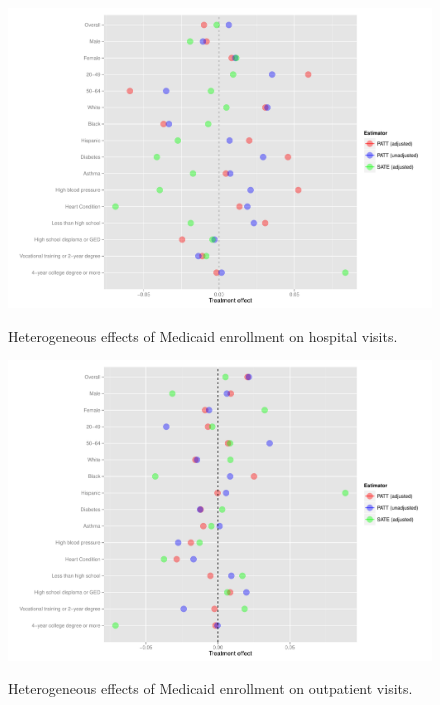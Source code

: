 \documentclass{beamer}
\begin{document}
\section[Heterogeneous treatment effects]{}
\begin{frame}
\begin{figure}[htbp]
\begin{center}
      \caption{Heterogeneous effects of Medicaid enrollment on hospital visits.}
   \includegraphics[scale=0.35]{../paper/any-visit-plot.pdf} 
   \label{het-plot-av}
   \end{center}
\end{figure}
\end{frame}

\begin{frame}
\begin{figure}[htbp]
\begin{center}
      \caption{Heterogeneous effects of Medicaid enrollment on outpatient visits.}
   \includegraphics[scale=0.35]{../paper/any-out-plot.pdf} 
   \label{het-plot-ao}
   \end{center}
\end{figure}
\end{frame}
\end{document}
